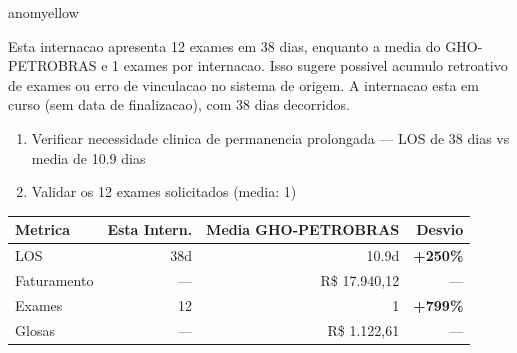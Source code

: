 \documentclass[a4paper,10pt]{article}
\begin{document}
\begin{anomalycard}[Internacao 165440 | GHO-PETROBRAS | MODERADO (z=2.98)]{anomyellow}
\vspace{2pt}\begin{tcolorbox}[colback=severityred!20,colframe=anomyellow,title={\textbf{Interpretacao de Negocio}},fonttitle=\bfseries\small,left=4pt,right=4pt,top=3pt,bottom=3pt]
{\small Esta internacao apresenta 12 exames em 38 dias, enquanto a media do GHO-PETROBRAS e 1 exames por internacao. Isso sugere possivel acumulo retroativo de exames ou erro de vinculacao no sistema de origem. A internacao esta em curso (sem data de finalizacao), com 38 dias decorridos.}
\end{tcolorbox}
\begin{tcolorbox}[colback=severityyellow!30,colframe=anomorange,title={\textbf{Recomendacoes Especificas}},fonttitle=\bfseries\small,left=4pt,right=4pt,top=3pt,bottom=3pt]
\begin{enumerate}[nosep,leftmargin=16pt]
\item {\small Verificar necessidade clinica de permanencia prolongada --- LOS de 38 dias vs media de 10.9 dias}
\item {\small Validar os 12 exames solicitados (media: 1)}
\end{enumerate}
\end{tcolorbox}
\begin{center}\begin{tabular}{l r r r}\toprule\textbf{Metrica} & \textbf{Esta Intern.} & \textbf{Media GHO-PETROBRAS} & \textbf{Desvio} \\\midrule
LOS & 38d & 10.9d & \textcolor{anomred}{\textbf{+250\%}} \\
Faturamento & --- & R\$ 17.940,12 & --- \\
Exames & 12 & 1 & \textcolor{anomred}{\textbf{+799\%}} \\
Glosas & --- & R\$ 1.122,61 & --- \\
\bottomrule\end{tabular}\end{center}


\end{anomalycard}
\end{document}
